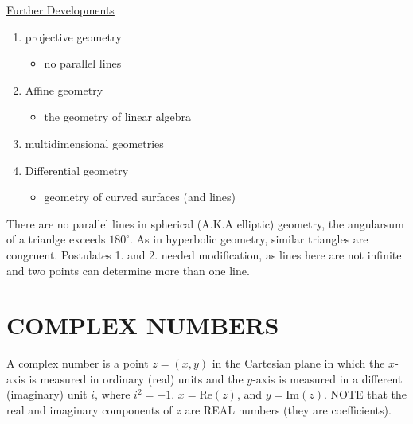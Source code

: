 \documentclass{book}
\begin{document}
\newpage

\underline{Further Developments}

\begin{enumerate}[label=$\rightarrow$]
\item projective geometry
\begin{itemize}\item no parallel lines\end{itemize}
\item Affine geometry
\begin{itemize}\item the geometry of  linear algebra\end{itemize}
\item multidimensional geometries
\item Differential geometry
\begin{itemize}\item geometry of curved surfaces (and lines)\end{itemize}
\end{enumerate}

\vspace{10pt}

There are no parallel lines in spherical (A.K.A elliptic) geometry, the angularsum of a trianlge exceeds $180^\circ$. As in hyperbolic geometry, similar triangles are congruent. Postulates 1. and 2. needed modification, as lines here are not infinite and two points can determine more than one line.

\chapter{COMPLEX NUMBERS}

A complex number is a point $z=(x,y)$ in the Cartesian plane in which the $x$-axis is measured in ordinary (real) units and the $y$-axis is measured in a different (imaginary) unit $i$, where $i^2=-1$. $x=\mbox{Re}(z)$, and $y=\mbox{Im}(z)$. NOTE that the real and imaginary components of $z$ are REAL numbers (they are coefficients).

\begin{center}
\end{center}
\end{document}
